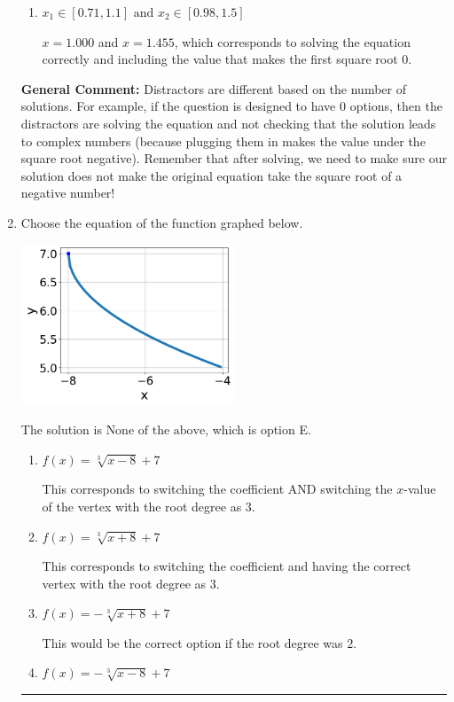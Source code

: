\documentclass{extbook}[14pt]
\newcommand{\litem}[1]{\item #1

\rule{\textwidth}{0.4pt}}
\begin{document}
\begin{enumerate}
{\begin{enumerate}[label=\Alph*.]
$x = 1.000$ and $x = 2.250$, which corresponds to solving each radical separately for 0.
\item \( x_1 \in [0.71, 1.1] \text{ and } x_2 \in [0.98,1.5] \)

$x = 1.000$ and $x = 1.455$, which corresponds to solving the equation correctly and including the value that makes the first square root 0.
\end{enumerate}

\textbf{General Comment:} Distractors are different based on the number of solutions. For example, if the question is designed to have 0 options, then the distractors are solving the equation and not checking that the solution leads to complex numbers (because plugging them in makes the value under the square root negative). Remember that after solving, we need to make sure our solution does not make the original equation take the square root of a negative number!
}
\litem{
Choose the equation of the function graphed below.

\begin{center}
    \includegraphics[width=0.5\textwidth]{../Figures/radicalGraphToEquationCopyA.png}
\end{center}


The solution is \( \text{None of the above} \), which is option E.\begin{enumerate}[label=\Alph*.]
\item \( f(x) = \sqrt[3]{x - 8} + 7 \)

This corresponds to switching the coefficient AND switching the $x$-value of the vertex with the root degree as $3$.
\item \( f(x) = \sqrt[3]{x + 8} + 7 \)

This corresponds to switching the coefficient and having the correct vertex with the root degree as $3$.
\item \( f(x) = - \sqrt[3]{x + 8} + 7 \)

This would be the correct option if the root degree was $2$.
\item \( f(x) = - \sqrt[3]{x - 8} + 7 \)


\end{enumerate}}
\end{enumerate}
\end{document}
